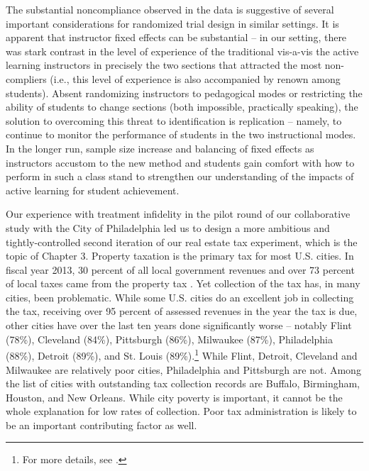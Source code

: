 The substantial noncompliance observed in the data is suggestive of
several important considerations for randomized trial design in similar
settings. It is apparent that instructor fixed effects can be
substantial -- in our setting, there was stark contrast in the level of
experience of the traditional vis-a-vis the active learning instructors
in precisely the two sections that attracted the most non-compliers
(i.e., this level of experience is also accompanied by renown among
students). Absent randomizing instructors to pedagogical modes or
restricting the ability of students to change sections (both impossible,
practically speaking), the solution to overcoming this threat to
identification is replication -- namely, to continue to monitor the
performance of students in the two instructional modes. In the longer
run, sample size increase and balancing of fixed effects as instructors
accustom to the new method and students gain comfort with how to perform
in such a class stand to strengthen our understanding of the impacts of
active learning for student achievement.

Our experience with treatment infidelity in the pilot round of our collaborative study with the City of Philadelphia led us to design a more ambitious and tightly-controlled second iteration of our real estate tax experiment, which is the topic of Chapter 3. Property taxation is the primary tax for most U.S. cities.  In fiscal
year 2013, 30 percent of all local government revenues and over 73
percent of local taxes came from the property tax
\cite{barnett2013state}.  Yet collection of the tax has, in many
cities, been problematic.  While some U.S. cities do an excellent job
in collecting the tax, receiving over 95 percent of assessed revenues
in the year the tax is due, other cities have over the last ten years
done significantly worse -- notably Flint (78\%), Cleveland (84\%),
Pittsburgh (86\%), Milwaukee (87\%), Philadelphia (88\%), Detroit
(89\%), and St. Louis (89\%).\footnote{For more details, see
  \cite{CILMS-16}.}  While Flint, Detroit, Cleveland and Milwaukee
are relatively poor cities, Philadelphia and Pittsburgh are not.
Among the list of cities with outstanding tax collection records are
Buffalo, Birmingham, Houston, and New Orleans.  While city poverty is
important, it cannot be the whole explanation for low rates of
collection.  Poor tax administration is likely to be an important
contributing factor as well.

